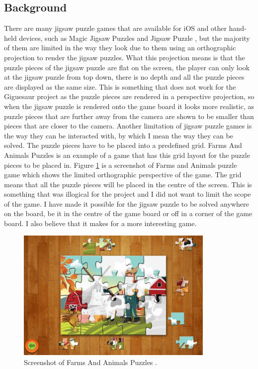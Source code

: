 \documentclass{article}
\begin{document}
\subsection{Background}
There are many jigsaw puzzle games that are available for iOS and other
hand-held devices, such as Magic Jigsaw Puzzles \cite{ref:MagicJigsaw} and
Jigsaw Puzzle \cite{ref:JigsawPuzzle}, but the majority of them are limited in
the way they look due to them using an orthographic projection to render the
jigsaw puzzles. What this projection means is that the puzzle pieces of the
jigsaw puzzle are flat on the screen, the player can only look at the jigsaw
puzzle from top down, there is no depth and all the puzzle pieces are displayed
as the same size. This is something that does not work for the Giguesaur project
as the puzzle pieces are rendered in a perspective projection, so when the
jigsaw puzzle is rendered onto the game board it looks more realistic, as puzzle
pieces that are further away from the camera are shown to be smaller than pieces
that are closer to the camera. Another limitation of jigsaw puzzle games is the
way they can be interacted with, by which I mean the way they can be solved. The
puzzle pieces have to be placed into a predefined grid. Farms And Animals
Puzzles \cite{ref:FarmPuzzle} is an example of a game that has this grid layout
for the puzzle pieces to be placed in. Figure \ref{fig:FarmsAnimals} is a
screenshot of Farms and Animals puzzle game which shows the limited orthographic
perspective of the game. The grid means that all the puzzle pieces will be
placed in the centre of the screen. This is something that was illogical for the
project and I did not want to limit the scope of the game. I have made it
possible for the jigsaw puzzle to be solved anywhere on the board, be it in the
centre of the game board or off in a corner of the game board. I also believe
that it makes for a more interesting game.

\begin{figure}[ht]
\begin{center}
\includegraphics[width=0.85\textwidth]{images/FarmAnimalsJigsawImage}
\caption{Screenshot of Farms And Animals Puzzles \cite{img:FarmPuzzle}.}
\label{fig:FarmsAnimals}
\end{center}
\end{figure}
\end{document}
